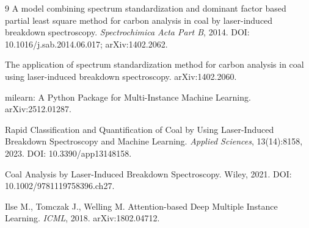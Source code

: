 \documentclass[11pt,a4paper,UTF8]{ctexart}
\begin{document}
\begin{thebibliography}{9}
 A model combining spectrum standardization and dominant factor based partial least square
method for carbon analysis in coal by laser-induced breakdown spectroscopy.
\textit{Spectrochimica Acta Part B}, 2014. DOI: 10.1016/j.sab.2014.06.017; arXiv:1402.2062.

 The application of spectrum standardization method for carbon analysis in coal using
laser-induced breakdown spectroscopy. arXiv:1402.2060.

 milearn: A Python Package for Multi-Instance Machine Learning. arXiv:2512.01287.

 Rapid Classification and Quantification of Coal by Using Laser-Induced Breakdown
Spectroscopy and Machine Learning. \textit{Applied Sciences}, 13(14):8158, 2023.
DOI: 10.3390/app13148158.

 Coal Analysis by Laser-Induced Breakdown Spectroscopy.
Wiley, 2021. DOI: 10.1002/9781119758396.ch27.

 Ilse M., Tomczak J., Welling M. Attention-based Deep Multiple Instance Learning.
\textit{ICML}, 2018. arXiv:1802.04712.
\end{thebibliography}
\end{document}
